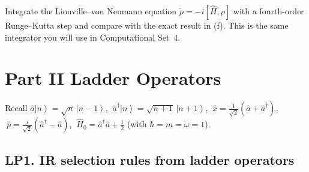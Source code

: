\documentclass[11pt]{article}
\newcommand{\ket}[1]{\left|#1\right\rangle}
\newcommand{\ad}{\hat{a}^{\dagger}}
\newcommand{\aop}{\hat{a}}
\newcommand{\xop}{\hat{x}}
\newcommand{\pop}{\hat{p}}
\newcommand{\Hop}{\hat{H}}
\begin{document}
\begin{gradext}
Integrate the Liouville--von Neumann equation $\dot\rho = -i[\Hop, \rho]$ with a fourth-order Runge--Kutta step and compare with the exact result in (f).
This is the same integrator you will use in Computational Set~4.
\end{gradext}

\clearpage
\section*{Part II \quad Ladder Operators}

\begin{setup}
Recall $\aop\ket n = \sqrt n\,\ket{n-1}$, $\ \ad\ket n = \sqrt{n+1}\,\ket{n+1}$,
$\ \xop = \tfrac{1}{\sqrt2}(\aop + \ad)$, $\ \pop = \tfrac{i}{\sqrt2}(\ad - \aop)$,
$\ \Hop_0 = \ad\aop + \tfrac12$ (with $\hbar = m = \omega = 1$).
\end{setup}

\subsection*{LP1. IR selection rules from ladder operators}
\end{document}
